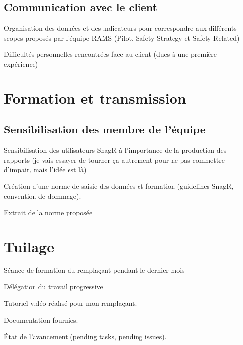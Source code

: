 \subsection{Communication avec le client}

Organisation des données et des indicateurs pour correspondre aux différents scopes proposés par l'équipe RAMS (Pilot, Safety Strategy et Safety Related)

Difficultés personnelles rencontrées face au client (dues à une première expérience) 

\newpage
\section{Formation et transmission}
\subsection{Sensibilisation des membre de l'équipe }
Sensibilisation des utilisateurs SnagR à l'importance de la production des rapports (je vais essayer de tourner ça autrement pour ne pas commettre d'impair, mais l'idée est là)

Création d'une norme de saisie des données et formation (guidelines SnagR, convention de dommage).

Extrait de la norme proposée

\section{Tuilage}

Séance de formation du remplaçant pendant le dernier mois

Délégation du travail progressive

Tutoriel vidéo réalisé pour mon remplaçant.

Documentation fournies.

État de l'avancement (pending tasks, pending issues).
